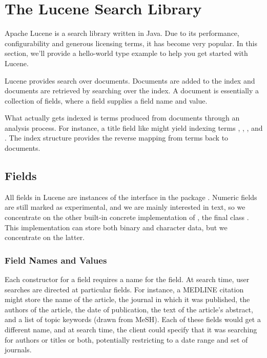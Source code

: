 \chapter{The Lucene Search Library}\label{appendix:lucene}

Apache Lucene is a search library written in Java.  Due to its
performance, configurability and generous licensing terms, it has
become very popular.  In this section, we'll provide a hello-world
type example to help you get started with Lucene.

Lucene provides search over documents.  Documents are added to the
index and documents are retrieved by searching over the index.  A
document is essentially a collection of fields, where a field
supplies a field name and value.  

What actually gets indexed is terms produced from documents through an
analysis process.  For instance, a title field like
 might yield indexing
terms , ,
, and .  The index structure
provides the reverse mapping from terms back to documents.


\section{Fields}

All fields in Lucene are instances of the  interface
in the package .  Numeric fields are
still marked as experimental, and we are mainly interested in text, so
we concentrate on the other built-in concrete implementation of
, the final class .  This implementation
can store both binary and character data, but we concentrate on the latter.

\subsection{Field Names and Values}

Each constructor for a field requires a name for the field.  At search
time, user searches are directed at particular fields.  For instance,
a MEDLINE citation might store the name of the article, the journal in
which it was published, the authors of the article, the date of
publication, the text of the article's abstract, and a list of topic
keywords (drawn from MeSH).  Each of these fields would get a
different name, and at search time, the client could specify that it
was searching for authors or titles or both, potentially restricting
to a date range and set of journals.

